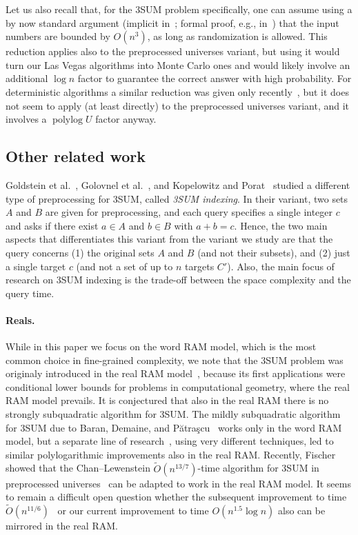 \documentclass[10pt,a4paper]{article}
\newcommand{\Ot}{\widetilde{O}}
\begin{document}
Let us also recall that, for the 3SUM problem specifically, one can assume using a by now standard argument (implicit in~\cite{BaranDP08}; formal proof, e.g., in~\cite[Lemma B.1]{AbboudLW14}) that the input numbers are bounded by $O(n^3)$, as long as randomization is allowed. This reduction applies also to the preprocessed universes variant, but using it would turn our Las Vegas algorithms into Monte Carlo ones and would likely involve an additional $\log n$ factor to guarantee the correct answer with high probability. For deterministic algorithms a similar reduction was given only recently~\cite{FischerK024}, but it does not seem to apply (at least directly) to the preprocessed universes variant, and it involves a $\operatorname{polylog} U$ factor anyway.

\subsection{Other related work}

Goldstein et al.~\cite{GoldsteinKLP17}, Golovnel et al.~\cite{GolovnevGHPV20}, and Kopelowitz and Porat~\cite{KopelowitzP19} studied a different type of preprocessing for 3SUM, called \emph{3SUM indexing}. In their variant, two sets $A$ and $B$ are given for preprocessing, and each query specifies a single integer $c$ and asks if there exist $a \in A$ and $b \in B$ with $a+b=c$. 
Hence, the two main aspects that differentiates this variant from the variant we study are that the query concerns (1) the original sets $A$ and $B$ (and not their subsets), and (2) just a single target $c$ (and not a set of up to $n$ targets $C'$). Also, the main focus of research on 3SUM indexing is the trade-off between the space complexity and the query time.

\paragraph{Reals.}

While in this paper we focus on the word RAM model, which is the most common choice in fine-grained complexity, we note that the 3SUM problem was originaly introduced in the real RAM model~\cite{GajentaanO95}, because its first applications were conditional lower bounds for problems in computational geometry, where the real RAM model prevails. It is conjectured that also in the real RAM there is no strongly subquadratic algorithm for 3SUM. The mildly subquadratic algorithm for 3SUM due to Baran, Demaine, and P{\u{a}}tra{\c{s}}cu~\cite{BaranDP08} works only in the word RAM model, but a separate line of research~\cite{GronlundP18,Chan20}, using very different techniques, led to similar polylogarithmic improvements also in the real RAM. Recently, Fischer~\cite{Fischer25} showed that the Chan--Lewenstein $\Ot(n^{13/7})$-time algorithm for 3SUM in preprocessed universes~\cite{ChanL15} can be adapted to work in the real RAM model. It seems to remain a difficult open question whether the subsequent improvement to time $\Ot(n^{11/6})$~\cite{ChanWX23} or our current improvement to time $O(n^{1.5} \log n)$ also can be mirrored in the real RAM.
\end{document}
